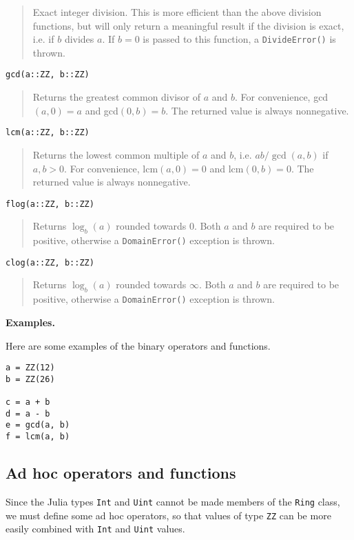 \documentclass[a4paper,10pt]{article}
\newcommand{\code}{\lstinline}
\newcommand{\desc}[1]{\vspace{-3mm}\begin{quote}#1\end{quote}}
\begin{document}
{{{{{{\desc{Exact integer division. This is more efficient than the above division functions,
but will only return a meaningful result if the division is exact, i.e. if $b$ divides
$a$. If $b = 0$ is passed to this function, a \code{DivideError()} is thrown.}

\begin{lstlisting}
gcd(a::ZZ, b::ZZ)
\end{lstlisting}

\desc{Returns the greatest common divisor of $a$ and $b$. For convenience, 
gcd$(a, 0) = a$ and gcd$(0, b) = b$. The returned value is always nonnegative.}

\begin{lstlisting}
lcm(a::ZZ, b::ZZ)
\end{lstlisting}

\desc{Returns the lowest common multiple of $a$ and $b$, i.e. $ab/\gcd(a, b)$ if
$a, b > 0$. For convenience, lcm$(a, 0) = 0$ and lcm$(0, b) = 0$. The returned
value is always nonnegative.}

\begin{lstlisting}
flog(a::ZZ, b::ZZ)
\end{lstlisting}

\desc{Returns $\log_b(a)$ rounded towards $0$. Both $a$ and $b$ are required
to be positive, otherwise a \code{DomainError()} exception is thrown.}

\begin{lstlisting}
clog(a::ZZ, b::ZZ)
\end{lstlisting}

\desc{Returns $\log_b(a)$ rounded towards $\infty$. Both $a$ and $b$ are required
to be positive, otherwise a \code{DomainError()} exception is thrown.}

\textbf{Examples.}

Here are some examples of the binary operators and functions.

\begin{lstlisting}
a = ZZ(12)
b = ZZ(26)

c = a + b
d = a - b
e = gcd(a, b)
f = lcm(a, b)
\end{lstlisting}

\subsection{Ad hoc operators and functions}

Since the Julia types \code{Int} and \code{Uint} cannot be made members of the
\code{Ring} class, we must define some ad hoc operators, so that values of type
\code{ZZ} can be more easily combined with \code{Int} and \code{Uint} values.

}}}}}}
\end{document}
